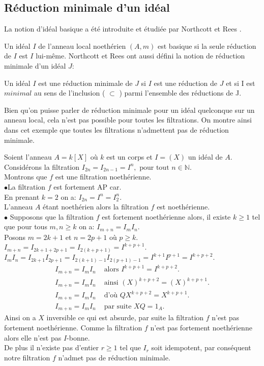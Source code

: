 \subsection{Réduction minimale d'un idéal}
La notion d'idéal basique a été introduite et étudiée par Northcott et Rees \cite{No}.
\begin{madefinition}
	Un idéal $I$ de l'anneau local noethérien $(A,m)$ est basique si la seule réduction de $I$ est $I$ lui-m\^{e}me. 
	Northcott et Rees ont aussi défini la notion de réduction minimale d'un idéal $J$:
	
	Un idéal $I$ est une réduction minimale de $J$ si $I$ est une réduction de $J$ et si I est $minimal$ au sens de l'inclusion ( $\subset$ ) parmi l'ensemble des réductions de J. 
\end{madefinition}
\begin{maremarque}
	Bien qu'on puisse parler de réduction minimale pour un idéal quelconque sur un anneau local, cela n'est pas possible pour toutes les filtrations. On montre ainsi dans cet exemple que toutes les filtrations n'admettent pas de réduction minimale.
\end{maremarque}
\begin{monexemple}
	Soient l'anneau $A = k\left[ X\right]$ où $k$ est un corps et $I = (X)$ un idéal de $A$.\\
	Considérons la filtration $I_{2n} = I_{2n-1} = I^n, \text{ pour tout } n \in \mathbb{N}$.\\
	Montrons que $f$ est une filtration noethérienne.\\
	$\bullet$La filtration $f$ est fortement AP car.\\En prenant $k = 2$ on a: $I_{2n} = I^n = I_2^n$.\\
	L’anneau $A$ étant noethérien alors la filtration $f$ est noethérienne.\\
	$\bullet$ Supposons que la filtration $f$ est fortement noethérienne alors, il existe $k \geq 1$ tel que pour tous $m, n \geq k$ on a: $I_{m+n} = I_m I_n$.\\
	Posons $m = 2k+1$ et $n = 2p+1$ où $p \geq k$.\\
	$I_{m+n} = I_{2k+1+2p+1} = I_{2(k+p+1)} = I^{k+p+1}$.\\
	$I_m I_n =  I_{2k+1}  I_{2p+1} =  I_{2(k+1)-1}  I_{2(p+1)-1} = I^{k+1} I^{p+1} = I^{k+p+2}.$
	\begin{align*}
		I_{m+n} = I_m I_n &\text{ alors } I^{k+p+1} = I^{k+p+2}.\\
		I_{m+n} = I_m I_n & \text{ ainsi } (X)^{k+p+2} = (X)^{k+p+1}.\\
		I_{m+n} = I_m I_n &\text{ d'où } QX^{k+p+2} = X^{k+p+1}.\\
		I_{m+n} = I_m I_n &\text{ par suite } XQ = 1_A.
	\end{align*}
	Ainsi on a $X$ inversible ce qui est absurde, par suite la filtration $f$ n'est pas fortement  noethérienne. Comme la filtration $f$ n'est pas fortement noethérienne alors elle n'est pas $I$-bonne.\\ De plus il n'existe pas d'entier $r \geq 1$ tel que $I_r$ soit idempotent, par conséquent notre filtration $f$ n'admet pas de réduction minimale.
\end{monexemple}
